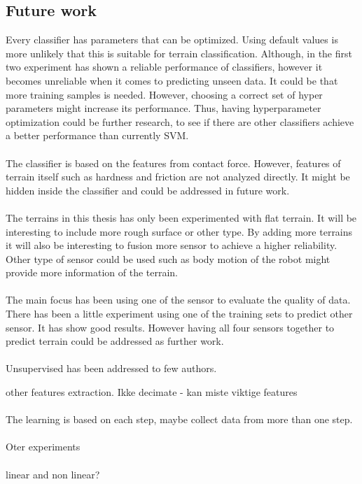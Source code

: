 \documentclass[USenglish]{ifimaster}  %
\begin{document}
	
\subsection{Future work}
Every classifier has parameters that can be optimized. Using default values is more unlikely that this is suitable for terrain classification. Although, in the first two experiment has shown a reliable performance of classifiers, however it becomes unreliable when it comes to predicting unseen data. It could be that more training samples is needed. However, choosing a correct set of hyper parameters might increase its performance. Thus, having hyperparameter optimization could be further research, to see if there are other classifiers achieve a better performance than currently SVM.
\\
\\
The classifier is based on the features from contact force. However, features of terrain itself such as hardness and friction are not analyzed directly. It might be hidden inside the classifier and could be addressed in future work. 
\\
\\
The terrains in this thesis has only been experimented with flat terrain. It will be interesting to include more rough surface or other type. By adding more terrains it will also be interesting to fusion more sensor to achieve a higher reliability. Other type of sensor could be used such as body motion of the robot might provide more information of the terrain.  
\\
\\
The main focus has been using one of the sensor to evaluate the quality of data. There has been a little experiment using one of the training sets to predict other sensor. It has show good results. However having all four sensors together to predict terrain could be addressed as further work.
\\
\\
Unsupervised has been addressed to few authors.
	
	other features extraction.
	Ikke decimate - kan miste viktige features
	\\
	\\
	The learning is based on each step, maybe collect data from more than one step.
	\\
	\\
	Oter experiments
	\\
	\\
	linear and non linear?
	
	
	
	
	\backmatter{}
	
	
\end{document}
